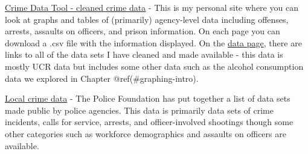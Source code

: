 \documentclass[
  12pt,
]{book}
\begin{document}
\href{http://jacobdkaplan.com/data}{Crime Data Tool - cleaned crime data} - This is my personal site where you can look at graphs and tables of (primarily) agency-level data including offenses, arrests, assaults on officers, and prison information. On each page you can download a .csv file with the information displayed. On the \href{http://jacobdkaplan.com/data.html}{data page}, there are links to all of the data sets I have cleaned and made available - this data is mostly UCR data but includes some other data such as the alcohol consumption data we explored in Chapter @ref(\#graphing-intro).

\href{https://www.policedatainitiative.org/datasets/}{Local crime data} - The Police Foundation has put together a list of data sets made public by police agencies. This data is primarily data sets of crime incidents, calls for service, arrests, and officer-involved shootings though some other categories such as workforce demographics and assaults on officers are available.

  
\end{document}
